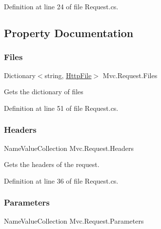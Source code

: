 Definition at line 24 of file Request.\+cs.



\subsection{Property Documentation}
\mbox{\label{class_mvc_1_1_request_aac2c6182ecc7705b2e8cc011cdf53fea}} 
\subsubsection{\texorpdfstring{Files}{Files}}
{\footnotesize\ttfamily Dictionary$<$string, \hyperlink{class_mvc_1_1_http_file}{Http\+File}$>$ Mvc.\+Request.\+Files\hspace{0.3cm}{\ttfamily [get]}}



Gets the dictionary of files 



Definition at line 51 of file Request.\+cs.

\mbox{\label{class_mvc_1_1_request_a98ac9e3caa73bc6512a760ed44d82a33}} 
\subsubsection{\texorpdfstring{Headers}{Headers}}
{\footnotesize\ttfamily Name\+Value\+Collection Mvc.\+Request.\+Headers\hspace{0.3cm}{\ttfamily [get]}}



Gets the headers of the request. 



Definition at line 36 of file Request.\+cs.

\mbox{\label{class_mvc_1_1_request_a26c0fa235c232271f53eb6ca20da121d}} 
\subsubsection{\texorpdfstring{Parameters}{Parameters}}
{\footnotesize\ttfamily Name\+Value\+Collection Mvc.\+Request.\+Parameters\hspace{0.3cm}{\ttfamily [get]}}



